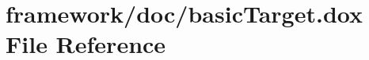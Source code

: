 \hypertarget{basic_target_8dox}{}\section{framework/doc/basic\+Target.dox File Reference}
\label{basic_target_8dox}
